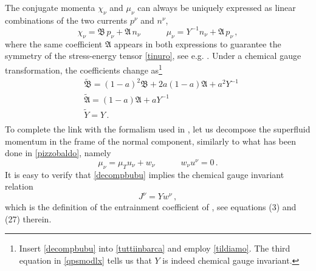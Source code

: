 \documentclass[preprints,article,accept,moreauthors,pdftex]{mdpi}
\newcommand{\spc}{\quad \quad \quad}
\begin{document}
The conjugate momenta $\chi_\nu$ and $\mu_\nu$ can always be uniquely expressed as linear combinations of the two currents $p^\nu$ and $n^\nu$,
\begin{equation}
\label{decompbubu}
\chi_\nu = \mathfrak{B}\,  p_\nu +\mathfrak{A} \, n_\nu  \spc  \mu_\nu = Y^{-1} n_\nu + \mathfrak{A}\, p_\nu \, ,
\end{equation}
where the same coefficient $\mathfrak{A}$ appears in both expressions to guarantee the symmetry of the stress-energy tensor \eqref{tinuro}, see e.g. \cite{Carter_Starting_Point,Termo}.
Under a chemical gauge transformation, the  coefficients change as\footnote{
Insert \eqref{decompbubu} into \eqref{tuttiinbarca} and  employ \eqref{tildiamo}.
The third equation in \eqref{qpsmodlx} tells us that $Y$ is indeed chemical gauge invariant. 
}
\begin{equation}\label{qpsmodlx}
\begin{split}
& \tilde{\mathfrak{B}}=(1-a)^2 \mathfrak{B}+2a(1-a)\mathfrak{A}+a^2 Y^{-1} \\
& \tilde{\mathfrak{A}}=(1-a)\mathfrak{A}+a Y^{-1} \\
& \tilde{Y}=Y \, . \\
\end{split}
\end{equation}
To complete the link with the formalism used in  \cite{Gusakov2007,Gusakov2016,Termo}, let us decompose the superfluid momentum in the frame of the normal component, similarly to what has been done in \eqref{pizzobaldo}, namely
\begin{equation}
\mu_\nu = \mu_T u_\nu +w_\nu  \spc w_\nu u^\nu =0 \, .
\end{equation}
It is easy to verify that \eqref{decompbubu} implies the chemical gauge invariant relation
\begin{equation}
J^\nu = Y w^\nu \, ,
\end{equation}
which is the definition of the entrainment coefficient of \citet{Gusakov2007}, see equations (3) and (27) therein.
\end{document}

